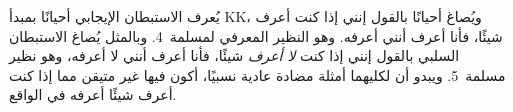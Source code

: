 \documentclass[../../../include/open-logic-section]{subfiles}
\begin{document}
يُعرف الاستبطان الإيجابي أحيانًا بمبدأ KK، ويُصاغ أحيانًا بالقول إنني
إذا كنت أعرف شيئًا، فأنا أعرف أنني أعرفه. وهو النظير المعرفي
لمسلمة~4. وبالمثل يُصاغ الاستبطان السلبي بالقول إنني إذا كنت
\emph{لا أعرف} شيئًا، فأنا أعرف أنني لا أعرفه، وهو نظير مسلمة~5.
ويبدو أن لكليهما أمثلة مضادة عادية نسبيًا، أكون فيها غير متيقن مما إذا
كنت أعرف شيئًا أعرفه في الواقع.
\end{document}
